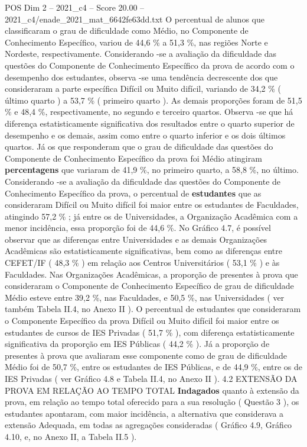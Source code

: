 \begin{textsample}{POS Dim 2 – 2021\_c4 – Score 20.00 – 2021\_c4/enade\_2021\_mat\_6642fe63dd.txt}
O percentual de alunos que classificaram o grau de dificuldade como Médio, no Componente de Conhecimento Específico, variou de 44,6 \% a 51,3 \%, nas regiões Norte e Nordeste, respectivamente.
Considerando -se a avaliação da dificuldade das questões do Componente de Conhecimento Específico da prova de acordo com o desempenho dos estudantes, observa -se uma tendência decrescente dos que consideraram a parte específica Difícil ou Muito difícil, variando de 34,2 \% ( último quarto ) a 53,7 \% ( primeiro quarto ).
As demais proporções foram de 51,5 \% e 48,4 \%, respectivamente, no segundo e terceiro quartos.
Observa -se que há diferença estatisticamente significativa dos resultados entre o quarto superior de desempenho e os demais, assim como entre o quarto inferior e os dois últimos quartos.
Já os que responderam que o grau de dificuldade das questões do Componente de Conhecimento Específico da prova foi Médio atingiram \textbf{percentagens} que variaram de 41,9 \%, no primeiro quarto, a 58,8 \%, no último.
Considerando -se a avaliação da dificuldade das questões do Componente de Conhecimento Específico da prova, o percentual de \textbf{estudantes} que as consideraram Difícil ou Muito difícil foi maior entre os estudantes de Faculdades, atingindo 57,2 \% ; já entre os de Universidades, a Organização Acadêmica com a menor incidência, essa proporção foi de 44,6 \%.
No Gráfico 4.7, é possível observar que as diferenças entre Universidades e as demais Organizações Acadêmicas são estatisticamente significativas, bem como as diferenças entre CEFET/IF ( 48,3 \% ) em relação aos Centros Universitários ( 53,1 \% ) e às Faculdades.
Nas Organizações Acadêmicas, a proporção de presentes à prova que consideraram o Componente de Conhecimento Específico de grau de dificuldade Médio esteve entre 39,2 \%, nas Faculdades, e 50,5 \%, nas Universidades ( ver também Tabela II.4, no Anexo II ).
O percentual de estudantes que consideraram o Componente Específico da prova Difícil ou Muito difícil foi maior entre os estudantes de cursos de IES Privadas ( 51,7 \% ), com diferença estatisticamente significativa da proporção em IES Públicas ( 44,2 \% ).
Já a proporção de presentes à prova que avaliaram esse componente como de grau de dificuldade Médio foi de 50,7 \%, entre os estudantes de IES Públicas, e de 44,9 \%, entre os de IES Privadas ( ver Gráfico 4.8 e Tabela II.4, no Anexo II ). 4.2 EXTENSÃO DA PROVA EM RELAÇÃO AO TEMPO TOTAL \textbf{Indagados} quanto à extensão da prova, em relação ao tempo total oferecido para a sua resolução ( Questão 3 ), os estudantes apontaram, com maior incidência, a alternativa que considerava a extensão Adequada, em todas as agregações consideradas ( Gráfico 4.9, Gráfico 4.10, e, no Anexo II, a Tabela II.5 ).

\end{textsample}
